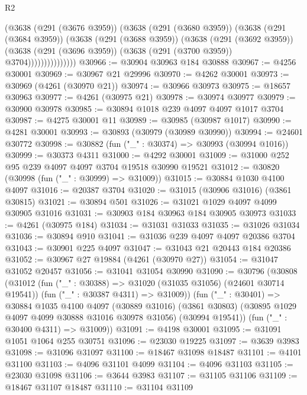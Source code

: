 \begin{lexlean}{R2}
\begin{coremodule}
                    (@3638
                      (@291 (@3676 @3959))
                      (@3638
                        (@291 (@3680 @3959))
                        (@3638
                          (@291 (@3684 @3959))
                          (@3638
                            (@291 (@3688 @3959))
                            (@3638
                              (@291 (@3692 @3959))
                              (@3638
                                (@291 (@3696 @3959))
                                (@3638 (@291 (@3700 @3959)) @3704)))))))))))))))
@30966 := @30904 @30963 @184 @30888
@30967 := @4256 @30001
@30969 := @30967 @21 @29996
@30970 := @4262 @30001
@30973 := @30969 (@4261 (@30970 @21))
@30974 := @30966 @30973
@30975 := @18657 @30963
@30977 := @4261 (@30975 @21)
@30978 := @30974 @30977
@30979 := @30900 @30978
@30985 := @30894 @1018 @239 @4097 @4097 @1017 @3704
@30987 := @4275 @30001 @11
@30989 := @30985 (@30987 @1017)
@30990 := @4281 @30001
@30993 := @30893 (@30979 (@30989 @30990))
@30994 := @24601 @30772
@30998 := @30882 (fun ("_" : @30374) => @30993 (@30994 @1016))
@30999 := @30373 @4311
@31000 := @4292 @30001
@31009 := @31000 @252 @95 @239 @4097 @4097 @3704 @19518 @30990 @19521
@31012 := @30820 (@30998 (fun ("_" : @30999) => @31009))
@31015 := @30884 @1030 @4100 @4097
@31016 := @20387 @3704
@31020 := @31015 (@30906 @31016) (@3861 @30815)
@31021 := @30894 @501
@31026 := @31021 @1029 @4097 @4099 @30905 @31016
@31031 := @30903 @184 @30963 @184 @30905 @30973
@31033 := @4261 (@30975 @184)
@31034 := @31031 @31033
@31035 := @31026 @31034
@31036 := @30894 @910
@31041 := @31036 @239 @4097 @4097 @20386 @3704
@31043 := @30901 @225 @4097
@31047 := @31043 @21 @20443 @184 @20386
@31052 := @30967 @27 @19884 (@4261 (@30970 @27))
@31054 := @31047 @31052 @20457
@31056 := @31041 @31054 @30990
@31090 := @30796
    (@30808
      (@31012
        (fun ("_" : @30388) => @31020 (@31035 @31056) (@24601 @30714 @19541))
        (fun ("_" : @30387 @4311) => @31009))
      (fun ("_" : @30401) =>
      @30884
        @1035
        @4100
        @4097
        (@30889 @31016)
        (@3861 @30803)
        (@30895 @1029 @4097 @4099 @30888 @31016 @30978 @31056)
        (@30994 @19541))
      (fun ("_" : @30400 @4311) => @31009))
@31091 := @4198 @30001
@31095 := @31091 @1051 @1064 @255 @30751
@31096 := @23030 @19225
@31097 := @3639 @3983
@31098 := @31096 @31097
@31100 := @18467 @31098 @18487
@31101 := @4101 @31100
@31103 := @4096 @31101 @4099
@31104 := @4096 @31103
@31105 := @23030 @31098
@31106 := @3644 @3983
@31107 := @31105 @31106
@31109 := @18467 @31107 @18487
@31110 := @31104 @31109

\end{coremodule}
\end{lexlean}
